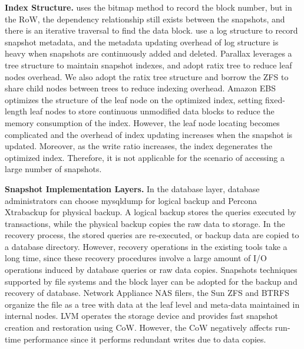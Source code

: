 \documentclass[sigconf, nonacm]{acmart}
\begin{document}
\textbf{Index Structure.}
\cite{DBLP:conf/icpads/LiZCY14} uses the bitmap method to record the block number, but in the RoW, the dependency relationship still exists between the snapshots, and there is an iterative traversal to find the data block. \cite{tsikoudis2018rql,shrira2005snap,tsikoudis2020rid} use a log structure to record snapshot metadata, and the metadata updating overhead of log structure is heavy when snapshots are continuously added and deleted. Parallax \cite{DBLP:conf/eurosys/MeyerACLFHW08} leverages a tree structure to maintain snapshot indexes, and adopt ratix tree to reduce leaf nodes overhead. We also adopt the ratix tree structure and borrow the ZFS \cite{rodeh2003zfs} to share child nodes between trees to reduce indexing overhead. Amazon EBS \cite{varia2014overview} optimizes the structure of the leaf node on the optimized index, setting fixed-length leaf nodes to store continuous unmodified data blocks to reduce the memory consumption of the index. However, the leaf node locating becomes complicated and the overhead of index updating increases when the snapshot is updated. Moreover, as the write ratio increases, the index degenerates the optimized index. Therefore, it is not applicable for the scenario of accessing a large number of snapshots.

\textbf{Snapshot Implementation Layers.}
In the database layer, database administrators can choose mysqldump \cite{mysqldump} for logical backup and Percona Xtrabackup \cite{xtrabackup} for physical backup. A logical backup stores the queries executed by transactions, while the physical backup copies the raw data to storage. In the recovery process, the stored queries are re-executed, or backup data are copied to a database directory. However, recovery operations in the existing tools take a long time, since these recovery procedures involve a large amount of I/O operations induced by database queries or raw data copies.
Snapshots techniques supported by file systems and the block layer can be adopted for the backup and recovery of database. Network Appliance NAS filers, the Sun ZFS \cite{rodeh2003zfs} and BTRFS \cite{rodeh2013btrfs} organize the file as a tree with data at the leaf level and meta-data maintained in internal nodes.
LVM \cite{hasenstein2001logical} operates the storage device and provides fast snapshot creation and restoration using CoW. However, the CoW negatively affects run-time performance since it performs redundant writes due to data copies.
\end{document}
